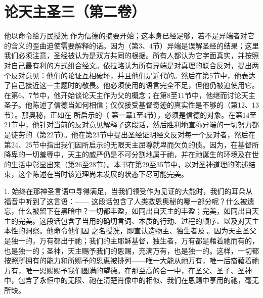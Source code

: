 

\section{论天主圣三（第二卷）}

他以命令给万民授洗  作为信德的摘要开始；这本身已经足够，若不是异端者对它的含义的歪曲迫使需要解释的话。因为（第3、4节）异端是误解圣经的结果；这里我们必须注意，圣经被认为是双方共同的根据。所有人都认为它字面真实，并按照对自己最有利的方式组合经文。依拉略认为所有异端是对真理的联合反对，提出两个反对意见：他们的论证互相破坏，并且他们是近代的。然后在第5节中，他表达了自己接近这一主题时的敬畏。他必须使用的语言完全不足，但他仍被迫使用它。在第6、7节中，他开始谈论天主作为父的概念；在第8至11节中，他继而讨论天主圣子。他陈述了信德当如何相信；仅仅接受基督奇迹的真实性是不够的（第12、13节）。那奥秘，正如在   所启示的（  第一章1至4节），必须是信德的对象。在第14至21节中，他针对当前的反对意见解释了这段话，然后胜利地宣称异端的一切努力都是徒劳的（第22节）。他在第23节中提出圣经证明经文反对每一个反对者，然后在第24、25节中指出我们因所启示的无限天主屈尊就卑而欠负的债。因为，在基督所降卑的一切羞辱中，天主的威严仍是不可分割地属于祂，并在祂诞生的环境及在世的生活中彰显出来（第26至28节）。本书在第29至35节中，以对圣神道理的陈述结束，这个陈述在当时该道理尚未发展的状态下尽可能完美。\par

1. 始终在那神圣言语中寻得满足，当我们领受作为见证的大能时，我们的耳朵从福音中听到了这言语：——   这段话包含了人类救恩奥秘的哪一部分呢？什么被遗忘，什么被留下在黑暗中？一切都丰盈，如同出自天主的丰盈；完美，如同出自天主的完美。这段话包含了当用的确切言词、本质的行动、过程的顺序、以及对天主本性的洞察。他命令他们因 之名授洗，即宣认造物主、独生者及 。因为天主圣父是独一的，万有都出于祂；我们的主耶稣基督，独生者，万有都是藉着祂而有的，也是独一的；圣神，天主赐予我们的恩赐，充满万有，也是独一的。这样，一切都按照所拥有的能力和所赐予的恩惠被排列——唯一大能从祂万有，唯一后裔藉着祂万有，唯一恩赐赐予我们圆满的望德。在那至高的合一中，在圣父、圣子、圣神中，包含了永恒中的无限、祂在清楚肖像中的相似、我们在恩赐中享用的祂，毫无所缺。\par

